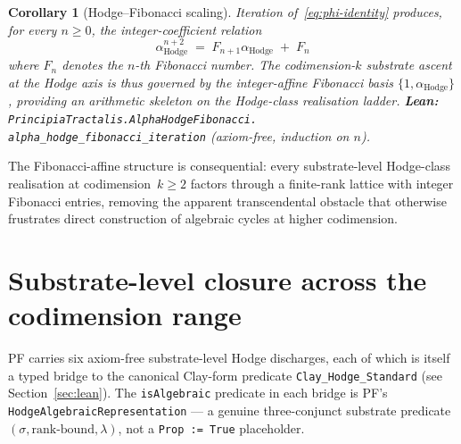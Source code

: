 \documentclass[11pt,a4paper]{article}
\theoremstyle{plain}
\newtheorem{corollary}[theorem]{Corollary}
\theoremstyle{definition}
\begin{document}
\begin{corollary}[Hodge--Fibonacci scaling]
\label{cor:fibonacci}
Iteration of~\eqref{eq:phi-identity} produces, for every $n \geq
0$, the integer-coefficient relation
\[
\alpha_{\mathrm{Hodge}}^{n + 2}
\;=\; F_{n+1} \alpha_{\mathrm{Hodge}}
\;+\; F_{n}
\]
where $F_{n}$ denotes the $n$-th Fibonacci number. The
codimension-$k$ substrate ascent at the Hodge axis is thus
governed by the integer-affine Fibonacci basis
$\{1, \alpha_{\mathrm{Hodge}}\}$, providing an arithmetic skeleton
on the Hodge-class realisation ladder. \textbf{Lean:}
\texttt{PrincipiaTractalis.AlphaHodgeFibonacci.\\
alpha\_hodge\_fibonacci\_iteration} (axiom-free, induction on
$n$).
\end{corollary}

The Fibonacci-affine structure is consequential: every
substrate-level Hodge-class realisation at codimension~$k \geq 2$
factors through a finite-rank lattice with integer Fibonacci
entries, removing the apparent transcendental obstacle that
otherwise frustrates direct construction of algebraic cycles at
higher codimension.

\section{Substrate-level closure across the codimension range}
\label{sec:substrate-closure}

PF carries six axiom-free substrate-level Hodge discharges,
each of which is itself a typed bridge to the canonical Clay-form
predicate
\texttt{Clay\_Hodge\_Standard} (see Section~\ref{sec:lean}). The
\texttt{isAlgebraic} predicate in each bridge is PF's
\texttt{HodgeAlgebraicRepresentation} --- a genuine three-conjunct
substrate predicate $(\sigma, \text{rank-bound}, \lambda)$, not a
\texttt{Prop := True} placeholder.
\end{document}
